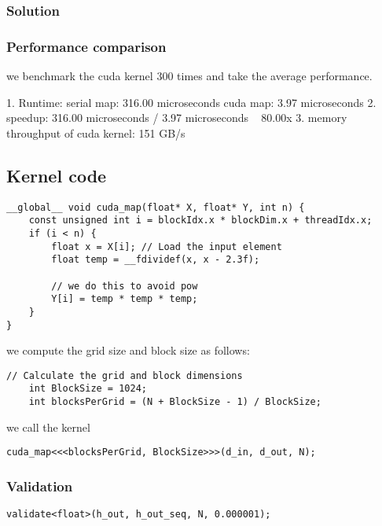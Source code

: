\documentclass{article}
\begin{document}
\subsubsection*{Solution}

\subsubsection*{Performance comparison}

we benchmark the cuda kernel 300 times and take the average performance.

1. Runtime: 
    serial map: 316.00 microseconds
    cuda map: 3.97 microseconds
2. speedup: 316.00 microseconds / 3.97 microseconds ~ 80.00x
3. memory throughput of cuda kernel: 151 GB/s


\subsection*{Kernel code}

\begin{lstlisting}[language=cuda]
 __global__ void cuda_map(float* X, float* Y, int n) {
    const unsigned int i = blockIdx.x * blockDim.x + threadIdx.x;
    if (i < n) {
        float x = X[i]; // Load the input element
        float temp = __fdividef(x, x - 2.3f); 

        // we do this to avoid pow
        Y[i] = temp * temp * temp;
    }
}
\end{lstlisting}

we compute the grid size and block size as follows:
\begin{lstlisting}[language=cuda]
    // Calculate the grid and block dimensions
    int BlockSize = 1024;
    int blocksPerGrid = (N + BlockSize - 1) / BlockSize;
\end{lstlisting}

we call the kernel 
\begin{lstlisting}[language=cuda]
    cuda_map<<<blocksPerGrid, BlockSize>>>(d_in, d_out, N);
\end{lstlisting}



\subsubsection*{Validation}

\begin{lstlisting}[language=cuda]
    validate<float>(h_out, h_out_seq, N, 0.000001);
\end{lstlisting}
\end{document}
